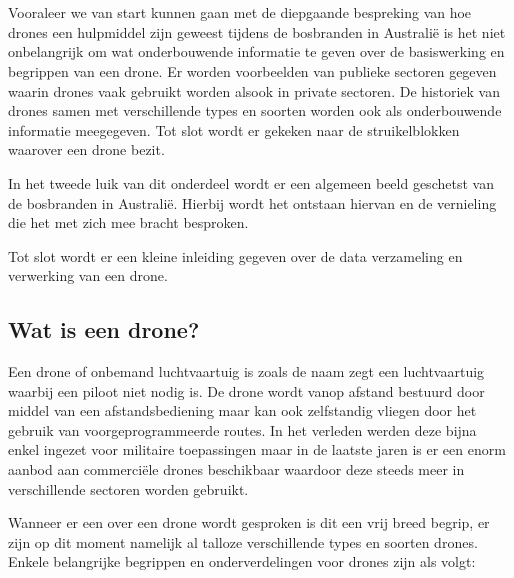 \chapter{}
\label{ch:stand-van-zaken}



Vooraleer we van start kunnen gaan met de diepgaande bespreking van hoe drones een hulpmiddel zijn geweest tijdens de bosbranden in Australië is het niet onbelangrijk om wat onderbouwende informatie te geven over de basiswerking en begrippen van een drone. Er worden voorbeelden van publieke sectoren gegeven waarin drones vaak gebruikt worden alsook in private sectoren. De historiek van drones samen met verschillende types en soorten worden ook als onderbouwende informatie meegegeven. Tot slot wordt er gekeken naar de struikelblokken waarover een drone bezit.

In het tweede luik van dit onderdeel wordt er een algemeen beeld geschetst van de bosbranden in Australië. Hierbij wordt het ontstaan hiervan en de vernieling die het met zich mee bracht besproken.

Tot slot wordt er een kleine inleiding gegeven over de data verzameling en verwerking van een drone.

\section{Wat is een drone?}
\label{sec:wat-zijn-drones}

Een drone of onbemand luchtvaartuig is zoals de naam zegt een luchtvaartuig waarbij een piloot niet nodig is. De drone wordt vanop afstand bestuurd door middel van een afstandsbediening maar kan ook zelfstandig vliegen door het gebruik van voorgeprogrammeerde routes. In het verleden werden deze bijna enkel ingezet voor militaire toepassingen maar in de laatste jaren is er een enorm aanbod aan commerciële drones beschikbaar waardoor deze steeds meer in verschillende sectoren worden gebruikt.

Wanneer er een over een drone wordt gesproken is dit een vrij breed begrip, er zijn op dit moment namelijk al talloze verschillende types en soorten drones. Enkele belangrijke begrippen en onderverdelingen voor drones zijn als volgt:

